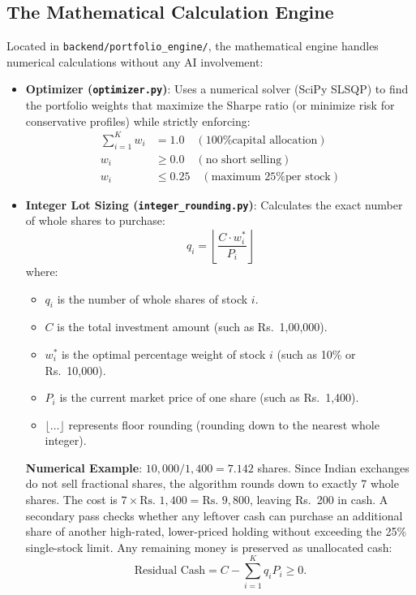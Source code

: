 \subsection{The Mathematical Calculation Engine}
Located in \texttt{backend/portfolio\_engine/}, the mathematical engine handles numerical calculations without any AI involvement:
\begin{itemize}
    \item \textbf{Optimizer (\texttt{optimizer.py})}: Uses a numerical solver (SciPy SLSQP) to find the portfolio weights that maximize the Sharpe ratio (or minimize risk for conservative profiles) while strictly enforcing:
    \begin{align*}
    \sum_{i=1}^{K} w_i &= 1.0 \quad (\text{100\% capital allocation}) \\
    w_i &\ge 0.0 \quad (\text{no short selling}) \\
    w_i &\le 0.25 \quad (\text{maximum 25\% per stock})
    \end{align*}
    \item \textbf{Integer Lot Sizing (\texttt{integer\_rounding.py})}: Calculates the exact number of whole shares to purchase:
    \begin{equation}
    q_i = \left\lfloor \frac{C \cdot w_i^*}{P_i} \right\rfloor
    \end{equation}
    where:
    \begin{itemize}
        \item $q_i$ is the number of whole shares of stock $i$.
        \item $C$ is the total investment amount (such as Rs.~1,00,000).
        \item $w_i^*$ is the optimal percentage weight of stock $i$ (such as 10\% or Rs.~10,000).
        \item $P_i$ is the current market price of one share (such as Rs.~1,400).
        \item $\lfloor \dots \rfloor$ represents floor rounding (rounding down to the nearest whole integer).
    \end{itemize}

    \textbf{Numerical Example}: $10,000 / 1,400 = 7.142$ shares. Since Indian exchanges do not sell fractional shares, the algorithm rounds down to exactly 7 whole shares. The cost is $7 \times \text{Rs.~}1,400 = \text{Rs.~}9,800$, leaving Rs.~200 in cash. A secondary pass checks whether any leftover cash can purchase an additional share of another high-rated, lower-priced holding without exceeding the 25\% single-stock limit. Any remaining money is preserved as unallocated cash:
    \begin{equation}
    \text{Residual Cash} = C - \sum_{i=1}^{K} q_i P_i \ge 0.
    \end{equation}


\end{itemize}

